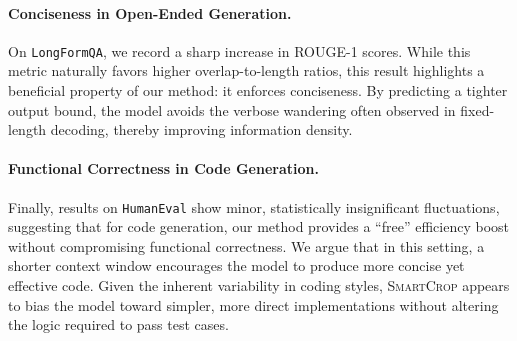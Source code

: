 \documentclass{article}
\theoremstyle{plain}
\theoremstyle{definition}
\theoremstyle{remark}
\begin{document}
\paragraph{Conciseness in Open-Ended Generation.} On \texttt{LongFormQA}, we record a sharp increase in \textsc{ROUGE-1} scores. While this metric naturally favors higher overlap-to-length ratios, this result highlights a beneficial property of our method: it enforces conciseness. By predicting a tighter output bound, the model avoids the verbose wandering often observed in fixed-length decoding, thereby improving information density.

\paragraph{Functional Correctness in Code Generation.} Finally, results on \texttt{HumanEval} show minor, statistically insignificant fluctuations, suggesting that for code generation, our method provides a ``free'' efficiency boost without compromising functional correctness. We argue that in this setting, a shorter context window encourages the model to produce more concise yet effective code. Given the inherent variability in coding styles, \textsc{SmartCrop} appears to bias the model toward simpler, more direct implementations without altering the logic required to pass test cases.



    
    
\end{document}
